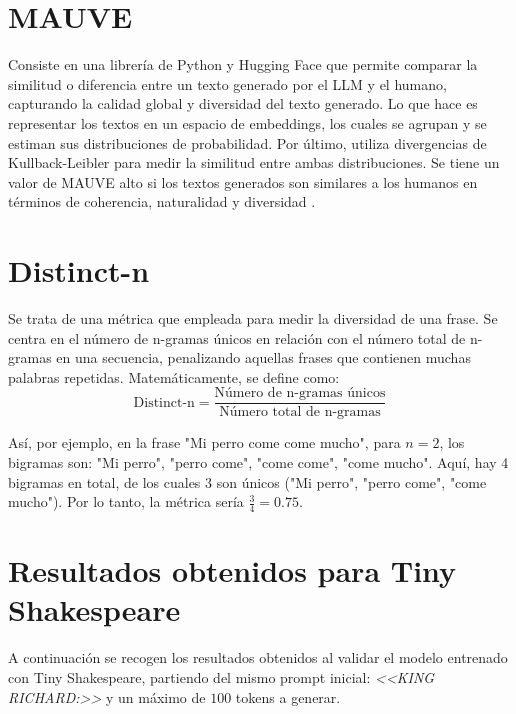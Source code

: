 \documentclass[11pt]{book}
\begin{document}
\section{MAUVE} \label{sec:mauve}

Consiste en una librería de Python y Hugging Face que permite comparar la similitud o diferencia entre un texto generado por el LLM y el humano, capturando la calidad global y diversidad del texto generado. Lo que hace es representar los textos en un espacio de embeddings, los cuales se agrupan y se estiman sus distribuciones de probabilidad. Por último, utiliza divergencias de Kullback-Leibler para medir la similitud entre ambas distribuciones. Se tiene un valor de MAUVE alto si los textos generados son similares a los humanos en términos de coherencia, naturalidad y diversidad \parencite{pillutla2021mauve_software}.
\section{Distinct-n} \label{sec:distinct-n}

Se trata de una métrica que empleada para medir la diversidad de una frase. Se centra en el número de n-gramas únicos en relación con el número total de n-gramas en una secuencia, penalizando aquellas frases que contienen muchas palabras repetidas. Matemáticamente, se define como:
\[
\text{Distinct-n} = \frac{\text{Número de n-gramas únicos}}{\text{Número total de n-gramas}}
\]

Así, por ejemplo, en la frase "Mi perro come come mucho", para $n=2$, los bigramas son: "Mi perro", "perro come", "come come", "come mucho". Aquí, hay 4 bigramas en total, de los cuales 3 son únicos ("Mi perro", "perro come", "come mucho"). Por lo tanto, la métrica sería $\frac{3}{4} = 0.75$.


\section{Resultados obtenidos para Tiny Shakespeare} \label{sec:res-tiny}

A continuación se recogen los resultados obtenidos al validar el modelo entrenado con Tiny Shakespeare, partiendo del mismo prompt inicial: \textit{<<KING RICHARD:>>} y un máximo de $100$ tokens a generar.
\end{document}
